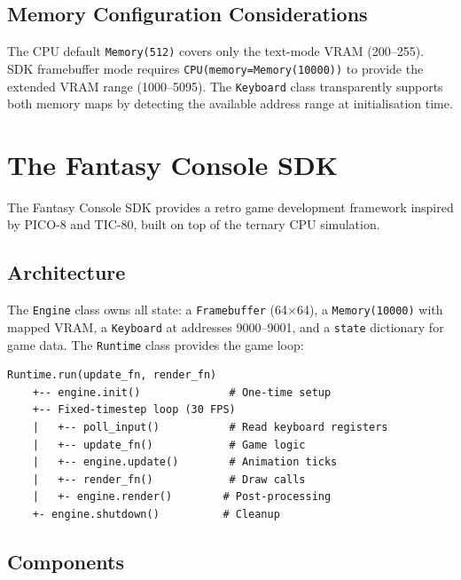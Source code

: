 \documentclass[10pt,a4paper,twoside]{book}
\begin{document}
\section{Memory Configuration Considerations}

The CPU default \texttt{Memory(512)} covers only the text-mode VRAM (200--255).
SDK framebuffer mode requires \texttt{CPU(memory=Memory(10000))} to provide the
extended VRAM range (1000--5095). The \texttt{Keyboard} class transparently
supports both memory maps by detecting the available address range at
initialisation time.

\chapter{The Fantasy Console SDK}
\label{ch:sdk}

The Fantasy Console SDK provides a retro game development framework inspired by
PICO-8 and TIC-80, built on top of the ternary CPU simulation.

\section{Architecture}

The \texttt{Engine} class owns all state: a \texttt{Framebuffer} (64$\times$64), a
\texttt{Memory(10000)} with mapped VRAM, a \texttt{Keyboard} at addresses 9000--9001,
and a \texttt{state} dictionary for game data. The \texttt{Runtime} class provides the
game loop:

\begin{verbatim}
Runtime.run(update_fn, render_fn)
    +-- engine.init()              # One-time setup
    +-- Fixed-timestep loop (30 FPS)
    |   +-- poll_input()           # Read keyboard registers
    |   +-- update_fn()            # Game logic
    |   +-- engine.update()        # Animation ticks
    |   +-- render_fn()            # Draw calls
    |   +- engine.render()        # Post-processing
    +- engine.shutdown()          # Cleanup
\end{verbatim}

\section{Components}
\end{document}
